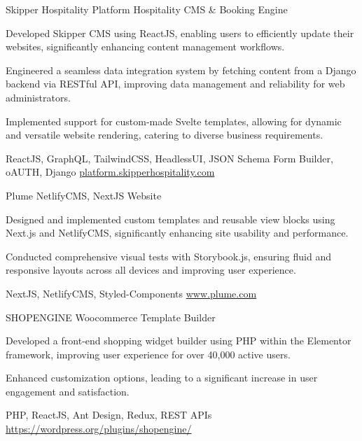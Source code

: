 

\begin{cventries}

  \cvproject
    {Skipper Hospitality Platform}
    {Hospitality CMS \& Booking Engine}
    {
      \begin{cvitems}
        \item {Developed Skipper CMS using ReactJS, enabling users to efficiently update their websites, significantly enhancing content management workflows.}
        \item {Engineered a seamless data integration system by fetching content from a Django backend via RESTful API, improving data management and reliability for web administrators.}
        \item {Implemented support for custom-made Svelte templates, allowing for dynamic and versatile website rendering, catering to diverse business requirements.}
      \end{cvitems}
    }
    {ReactJS, GraphQL, TailwindCSS, HeadlessUI, JSON Schema Form Builder, oAUTH, Django}
    {\href{https://platform.skipperhospitality.com/}{platform.skipperhospitality.com}}

  \cvproject
    {Plume}
    {NetlifyCMS, NextJS Website}
    {
      \begin{cvitems}
        \item {Designed and implemented custom templates and reusable view blocks using Next.js and NetlifyCMS, significantly enhancing site usability and performance.}
        \item {Conducted comprehensive visual tests with Storybook.js, ensuring fluid and responsive layouts across all devices and improving user experience.}
      \end{cvitems}
    }
    {NextJS, NetlifyCMS, Styled-Components}
    {\href{https://www.plume.com}{www.plume.com}}

  \cvproject
    {SHOPENGINE}
    {Woocommerce Template Builder}
    {
      \begin{cvitems}
        \item {Developed a front-end shopping widget builder using PHP within the Elementor framework, improving user experience for over 40,000 active users.}
        \item {Enhanced customization options, leading to a significant increase in user engagement and satisfaction.}
      \end{cvitems}
    }
    {PHP, ReactJS, Ant Design, Redux, REST APIs}
    {\href{https://wordpress.org/plugins/shopengine/}{https://wordpress.org/plugins/shopengine/}}


\end{cventries}

